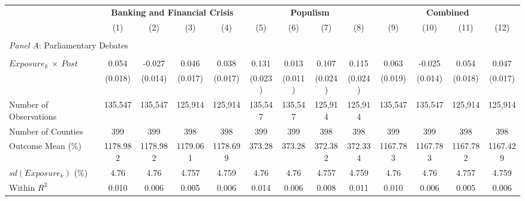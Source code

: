 \begin{tabular}{l*{1}cccccccccccc}
\toprule
& \multicolumn{4}{c}{\textbf{Banking and Financial Crisis}}
& \multicolumn{4}{c}{\textbf{Populism}}
& \multicolumn{4}{c}{\textbf{Combined}}
\\ 
& \multicolumn{1}{c}{(1)}
& \multicolumn{1}{c}{(2)}
& \multicolumn{1}{c}{(3)}
& \multicolumn{1}{c}{(4)}
& \multicolumn{1}{c}{(5)}
& \multicolumn{1}{c}{(6)}
& \multicolumn{1}{c}{(7)}
& \multicolumn{1}{c}{(8)}
& \multicolumn{1}{c}{(9)}
& \multicolumn{1}{c}{(10)}
& \multicolumn{1}{c}{(11)}
& \multicolumn{1}{c}{(12)}
\\ 
\midrule
\\ 
\multicolumn{13}{l}{\textit{Panel A}: 
Parliamentary Debates}
\\ \\

$ Exposure_{k}\ \times \ Post $&       0.054\sym{***}&      -0.027\sym{**} &       0.046\sym{***}&       0.038\sym{**} &       0.131\sym{***}&       0.013         &       0.107\sym{***}&       0.115\sym{***}&       0.063\sym{***}&      -0.025\sym{*}  &   
   0.054\sym{***}&       0.047\sym{***}\\
           &     (0.018)         &     (0.014)         &     (0.017)         &     (0.017)         &     (0.023)         &     (0.011)         &     (0.024)         &     (0.024)         &     (0.019)         &     (0.014)         &     (0.018)         &
    (0.017)         \\
Number of Observations&     135,547         &     135,547         &     125,914         &     125,914         &     135,547         &     135,547         &     125,914         &     125,914         &     135,547         &     135,547         &     125,914
        &     125,914         \\
Number of Counties&         399         &         399         &         398         &         398         &    399         &         399         &         398         &         398         &         399         &         399         &         398    
    &         398         \\
Outcome Mean (\%)&    1178.982         &    1178.982         &    1179.061         &    1178.699         &     373.28         &      373.28         &     372.382         &     372.334         &    1167.783         &    1167.783         &    1167.782     
   &    1167.429         \\
$ sd\left(Exposure_k\right) $ (\%)&        4.76         &        4.76         &       4.757         &       4.759         &        4.76         &        4.76         &       4.757         &       4.759         &        4.76         &        4.76         &
      4.757         &       4.759         \\
Within $ R^2 $&       0.010         &       0.006         &       0.005         &       0.006         &       0.014         &       0.006         &       0.008         &       0.011         &       0.010         &       0.006         &       0.005        
&       0.006         \\


\end{tabular}
